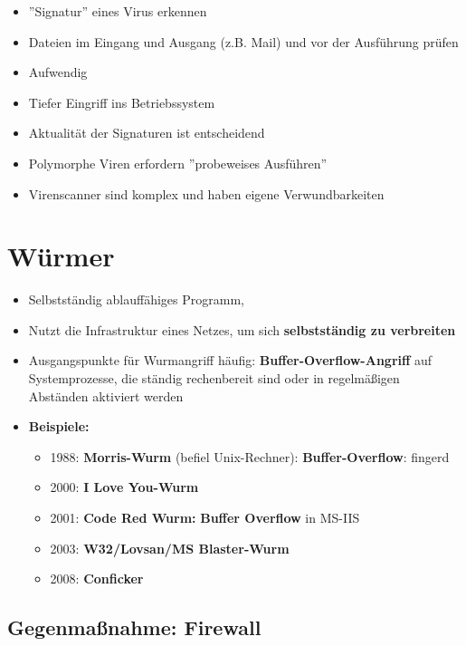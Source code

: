 \documentclass[openany]{book}
\begin{document}
\begin{itemize}
    \item ''Signatur'' eines Virus erkennen
    \item Dateien im Eingang und Ausgang (z.B. Mail) und vor der Ausführung prüfen
    \item Aufwendig
    \item Tiefer Eingriff ins Betriebssystem
    \item Aktualität der Signaturen ist entscheidend
    \item Polymorphe Viren erfordern ''probeweises Ausführen''
    \item Virenscanner sind komplex und haben eigene Verwundbarkeiten
\end{itemize}

\section{Würmer}

\begin{itemize}
    \item Selbstständig ablauffähiges Programm,
    \item Nutzt die Infrastruktur eines Netzes, um sich \textbf{selbstständig zu verbreiten}
    \item Ausgangspunkte für Wurmangriff häufig: \textbf{Buffer-Overflow-Angriff} auf Systemprozesse, die ständig rechenbereit sind oder in regelmäßigen Abständen aktiviert werden
    \item \textbf{Beispiele:}
    \begin{itemize}
        \item 1988: \textbf{Morris-Wurm} (befiel Unix-Rechner): \textbf{Buffer-Overflow}: fingerd
        \item 2000: \textbf{I Love You-Wurm}
        \item 2001: \textbf{Code Red Wurm:} \textbf{Buffer Overflow} in MS-IIS
        \item 2003: \textbf{W32/Lovsan/MS Blaster-Wurm}
        \item 2008: \textbf{Conficker}
    \end{itemize}
\end{itemize}

\subsection{Gegenmaßnahme: Firewall}
\end{document}
